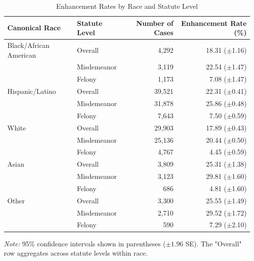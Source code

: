 \begin{table}[H]
\caption{Enhancement Rates by Race and Statute Level}
\label{tab:enhancement_overall}
\begin{tabular}{llrr}
\toprule
Canonical Race & Statute Level & Number of Cases & Enhancement Rate (\%) \\
\midrule
\rowcolor{gray!15} Black/African American & Overall & 4,292 & 18.31 ({\scriptsize $\pm$1.16}) \\
 & Misdemeanor & 3,119 & 22.54 ({\scriptsize $\pm$1.47}) \\
 & Felony & 1,173 & 7.08 ({\scriptsize $\pm$1.47}) \\
\midrule
\rowcolor{gray!15} Hispanic/Latino & Overall & 39,521 & 22.31 ({\scriptsize $\pm$0.41}) \\
 & Misdemeanor & 31,878 & 25.86 ({\scriptsize $\pm$0.48}) \\
 & Felony & 7,643 & 7.50 ({\scriptsize $\pm$0.59}) \\
\midrule
\rowcolor{gray!15} White & Overall & 29,903 & 17.89 ({\scriptsize $\pm$0.43}) \\
 & Misdemeanor & 25,136 & 20.44 ({\scriptsize $\pm$0.50}) \\
 & Felony & 4,767 & 4.45 ({\scriptsize $\pm$0.59}) \\
\midrule
\rowcolor{gray!15} Asian & Overall & 3,809 & 25.31 ({\scriptsize $\pm$1.38}) \\
 & Misdemeanor & 3,123 & 29.81 ({\scriptsize $\pm$1.60}) \\
 & Felony & 686 & 4.81 ({\scriptsize $\pm$1.60}) \\
\midrule
\rowcolor{gray!15} Other & Overall & 3,300 & 25.55 ({\scriptsize $\pm$1.49}) \\
 & Misdemeanor & 2,710 & 29.52 ({\scriptsize $\pm$1.72}) \\
 & Felony & 590 & 7.29 ({\scriptsize $\pm$2.10}) \\
\bottomrule
\end{tabular}
\smallskip
\parbox{\textwidth}{\footnotesize \textit{Note:} 95\% confidence intervals shown in parentheses ($\pm 1.96$ SE). The "Overall" row aggregates across statute levels within race.}
\end{table}